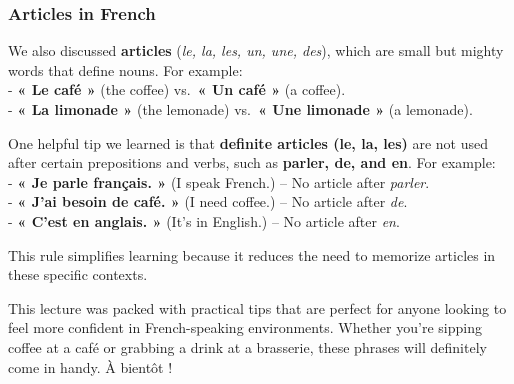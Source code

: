 \documentclass[
  16pt,
  letterpaper,
  DIV=11,
  numbers=noendperiod]{scrartcl}
\begin{document}
\subsubsection{Articles in French}\label{articles-in-french}

We also discussed \textbf{articles} (\emph{le, la, les, un, une, des}),
which are small but mighty words that define nouns. For example:\\
- \textbf{« Le café »} (the coffee) vs.~\textbf{« Un café »} (a
coffee).\\
- \textbf{« La limonade »} (the lemonade) vs.~\textbf{« Une limonade »}
(a lemonade).

One helpful tip we learned is that \textbf{definite articles (le, la,
les)} are not used after certain prepositions and verbs, such as
\textbf{parler, de, and en}. For example:\\
- \textbf{« Je parle français. »} (I speak French.) -- No article after
\emph{parler}.\\
- \textbf{« J'ai besoin de café. »} (I need coffee.) -- No article after
\emph{de}.\\
- \textbf{« C'est en anglais. »} (It's in English.) -- No article after
\emph{en}.

This rule simplifies learning because it reduces the need to memorize
articles in these specific contexts.

This lecture was packed with practical tips that are perfect for anyone
looking to feel more confident in French-speaking environments. Whether
you're sipping coffee at a café or grabbing a drink at a brasserie,
these phrases will definitely come in handy. À bientôt !
\end{document}
